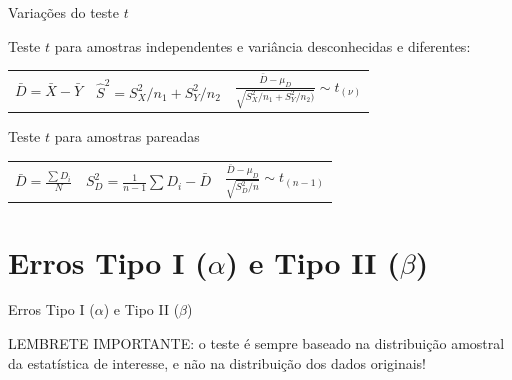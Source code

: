 \documentclass{beamer}\usepackage[]{graphicx}\usepackage[]{color}
\begin{document}
\begin{frame}{Variações do teste $t$}

Teste $t$ para amostras independentes e variância desconhecidas e diferentes: 
\vfill

\begin{scriptsize}
\begin{tabular}{ c c c }

$\bar{D} = \bar{X} - \bar{Y}$ & $ \hat{S}^{2}= S^{2}_{X}/n_1 + S^{2}_{Y}/n_2$ & $\frac{\bar{D}-\mu_D}{\sqrt{S^{2}_{X}/n_1 + S^{2}_{Y}/n_2)}} \sim t_{(\nu)}$   \\

\end{tabular}
\end{scriptsize}

\vfill

Teste $t$ para amostras pareadas
\vfill

\begin{scriptsize}
\begin{tabular}{ c c c }

$\bar{D} = \frac{\sum{D_i}}{N}$ & $ S^{2}_{D}= \frac{1}{n-1}\sum{D_i - \bar{D}}$ & $\frac{\bar{D}-\mu_D}{\sqrt{S^{2}_{D}/n}} \sim t_{(n-1)}$   \\

\end{tabular}
\end{scriptsize}

\end{frame}

\section{Erros Tipo I ($\alpha$) e Tipo II ($\beta$)}

\begin{frame}{Erros Tipo I ($\alpha$) e Tipo II ($\beta$)}

\alert{LEMBRETE IMPORTANTE:} o teste é sempre baseado na distribuição amostral da estatística de interesse, e não na distribuição dos dados originais!


\end{frame}
% 
\end{document}

